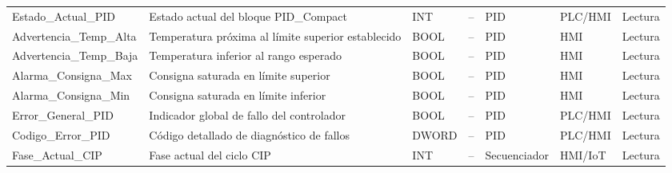 \begin{small}
\begin{longtable}{L{3.2cm}L{3.5cm}L{1.0cm}L{0.8cm}L{1.8cm}L{1.8cm}L{1.1cm}}
Estado\_\allowbreak Actual\_\allowbreak PID & Estado actual del bloque PID\_Compact & INT & -- & PID & PLC/HMI & Lectura \\
Advertencia\_\allowbreak Temp\_\allowbreak Alta & Temperatura próxima al límite superior establecido & BOOL & -- & PID & HMI & Lectura \\
Advertencia\_\allowbreak Temp\_\allowbreak Baja & Temperatura inferior al rango esperado & BOOL & -- & PID & HMI & Lectura \\
Alarma\_\allowbreak Consigna\_\allowbreak Max & Consigna saturada en límite superior & BOOL & -- & PID & HMI & Lectura \\
Alarma\_\allowbreak Consigna\_\allowbreak Min & Consigna saturada en límite inferior & BOOL & -- & PID & HMI & Lectura \\
Error\_\allowbreak General\_\allowbreak PID & Indicador global de fallo del controlador & BOOL & -- & PID & PLC/HMI & Lectura \\
Codigo\_\allowbreak Error\_\allowbreak PID & Código detallado de diagnóstico de fallos & DWORD & -- & PID & PLC/HMI & Lectura \\
Fase\_\allowbreak Actual\_\allowbreak CIP & Fase actual del ciclo CIP & INT & -- & Secuenciador & HMI/IoT & Lectura \\
\bottomrule
\end{longtable}
\end{small}